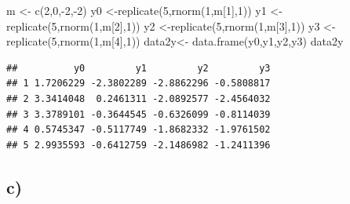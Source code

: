 \documentclass[
]{article}
\newenvironment{Shaded}{\begin{snugshade}}{\end{snugshade}}
\newcommand{\DecValTok}[1]{\textcolor[rgb]{0.00,0.00,0.81}{#1}}
\newcommand{\FunctionTok}[1]{\textcolor[rgb]{0.00,0.00,0.00}{#1}}
\newcommand{\NormalTok}[1]{#1}
\newcommand{\OtherTok}[1]{\textcolor[rgb]{0.56,0.35,0.01}{#1}}
\newcommand{\SpecialCharTok}[1]{\textcolor[rgb]{0.00,0.00,0.00}{#1}}
\begin{document}
\begin{Shaded}
\begin{Highlighting}[]
\NormalTok{m }\OtherTok{\textless{}{-}} \FunctionTok{c}\NormalTok{(}\DecValTok{2}\NormalTok{,}\DecValTok{0}\NormalTok{,}\SpecialCharTok{{-}}\DecValTok{2}\NormalTok{,}\SpecialCharTok{{-}}\DecValTok{2}\NormalTok{)}
\NormalTok{y0 }\OtherTok{\textless{}{-}}\FunctionTok{replicate}\NormalTok{(}\DecValTok{5}\NormalTok{,}\FunctionTok{rnorm}\NormalTok{(}\DecValTok{1}\NormalTok{,m[}\DecValTok{1}\NormalTok{],}\DecValTok{1}\NormalTok{)) }
\NormalTok{y1 }\OtherTok{\textless{}{-}}\FunctionTok{replicate}\NormalTok{(}\DecValTok{5}\NormalTok{,}\FunctionTok{rnorm}\NormalTok{(}\DecValTok{1}\NormalTok{,m[}\DecValTok{2}\NormalTok{],}\DecValTok{1}\NormalTok{))}
\NormalTok{y2 }\OtherTok{\textless{}{-}}\FunctionTok{replicate}\NormalTok{(}\DecValTok{5}\NormalTok{,}\FunctionTok{rnorm}\NormalTok{(}\DecValTok{1}\NormalTok{,m[}\DecValTok{3}\NormalTok{],}\DecValTok{1}\NormalTok{))}
\NormalTok{y3 }\OtherTok{\textless{}{-}}\FunctionTok{replicate}\NormalTok{(}\DecValTok{5}\NormalTok{,}\FunctionTok{rnorm}\NormalTok{(}\DecValTok{1}\NormalTok{,m[}\DecValTok{4}\NormalTok{],}\DecValTok{1}\NormalTok{))}
\NormalTok{data2y}\OtherTok{\textless{}{-}} \FunctionTok{data.frame}\NormalTok{(y0,y1,y2,y3)}
\NormalTok{data2y}
\end{Highlighting}
\end{Shaded}

\begin{verbatim}
##          y0         y1         y2         y3
## 1 1.7206229 -2.3802289 -2.8862296 -0.5808817
## 2 3.3414048  0.2461311 -2.0892577 -2.4564032
## 3 3.3789101 -0.3644545 -0.6326099 -0.8114039
## 4 0.5745347 -0.5117749 -1.8682332 -1.9761502
## 5 2.9935593 -0.6412759 -2.1486982 -1.2411396
\end{verbatim}

\hypertarget{c-1}{%
\subsection{c)}\label{c-1}}
\end{document}
